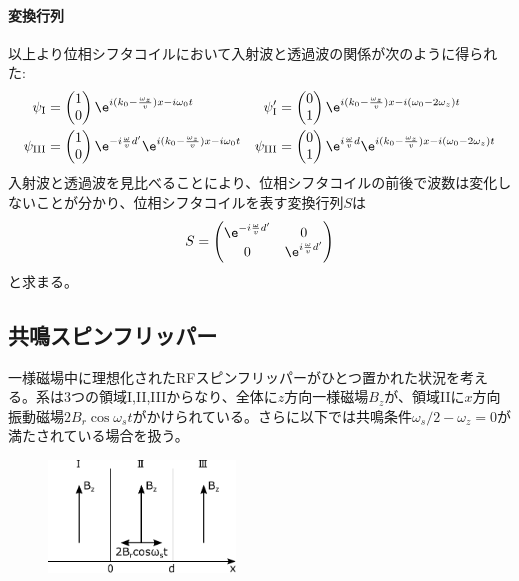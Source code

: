 \paragraph{変換行列}
以上より位相シフタコイルにおいて入射波と透過波の関係が次のように得られた:
\begin{align}
\psi_\mathrm{I}&= \begin{pmatrix} 1\\0 \end{pmatrix} \e^{i (k_0-\frac{\omega_z}{v}) x -i\omega_0 t} & \psi'_\mathrm{I}&= \begin{pmatrix} 0\\1 \end{pmatrix} \e^{i (k_0-\frac{\omega_z}{v}) x -i(\omega_0-2\omega_z) t} \\
\psi_\mathrm{III}&=\begin{pmatrix} 1\\0 \end{pmatrix} \e^{-i\frac{\omega}{v}d'} \e^{i (k_0-\frac{\omega_z}{v})x -i\omega_0 t} & \psi_\mathrm{III}&=\begin{pmatrix} 0\\1 \end{pmatrix} \e^{i\frac{\omega}{v}d} \e^{i (k_0-\frac{\omega_z}{v}) x -i(\omega_0-2\omega_z) t}
\end{align}
入射波と透過波を見比べることにより、位相シフタコイルの前後で波数は変化しないことが分かり、位相シフタコイルを表す変換行列$S$は
\begin{equation}
S=\begin{pmatrix} \e^{-i\frac{\omega}{v}d'} & 0\\0 &\e^{i\frac{\omega}{v}d'} \end{pmatrix}
\end{equation}
と求まる。

\subsection{共鳴スピンフリッパー}
一様磁場中に理想化されたRFスピンフリッパーがひとつ置かれた状況を考える。系は3つの領域I,II,IIIからなり、全体に$z$方向一様磁場$B_z$が、領域IIに$x$方向振動磁場$2B_r \cos \omega_s t$がかけられている。さらに以下では共鳴条件$\omega_s/2-\omega_z=0$が満たされている場合を扱う。
\begin{figure}[H]
\centering
\includegraphics[height=3cm]{matrix/spinflipper.pdf}
\end{figure}

